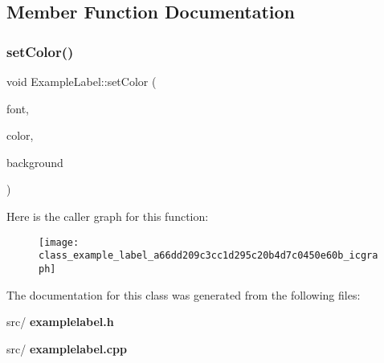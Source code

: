 \subsection{Member Function Documentation}
\mbox{\label{class_example_label_a66dd209c3cc1d295c20b4d7c0450e60b}} 
\subsubsection{set\+Color()}
{\footnotesize\ttfamily void Example\+Label\+::set\+Color (\begin{DoxyParamCaption}\item[{Q\+Font}]{font,  }\item[{Q\+Color}]{color,  }\item[{Q\+Color}]{background }\end{DoxyParamCaption})}

Here is the caller graph for this function\+:\nopagebreak
\begin{figure}[H]
\begin{center}
\leavevmode
\texttt{[image: class\_example\_label\_a66dd209c3cc1d295c20b4d7c0450e60b\_icgraph]}
\end{center}
\end{figure}


The documentation for this class was generated from the following files\+:\begin{DoxyCompactItemize}
\item 
src/\textbf{ examplelabel.\+h}\item 
src/\textbf{ examplelabel.\+cpp}\end{DoxyCompactItemize}
